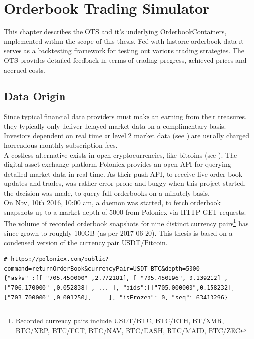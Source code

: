 \chapter{Orderbook Trading Simulator}
\label{chap:simulator}
This chapter describes the \ac{OTS} and it's underlying OrderbookContainers, implemented within the scope of this thesis. Fed with historic orderbook data it serves as a backtesting framework for testing out various trading strategies. The \ac{OTS} provides detailed feedback in terms of trading progress, achieved prices and accrued costs.

\section{Data Origin}
Since typical financial data providers must make an earning from their treasures, they typically only deliver delayed market data on a complimentary basis. Investors dependent on real time or level 2 market data (see ) are usually charged horrendous monthly subscription fees.\\

A costless alternative exists in open cryptocurrencies, like bitcoins (see ). The digital asset exchange platform Poloniex \cite{poloniex} provides an open API for querying detailed market data in real time. As their push API, to receive live order book updates and trades, was rather error-prone and buggy when this project started, the decision was made, to query full orderbooks on a minutely basis.\\

On Nov, 10th 2016, 10:00 am, a daemon was started, to fetch orderbook snapshots up to a market depth of 5000 from Poloniex via HTTP GET requests. The volume of recorded orderbook snapshots for nine distinct currency pairs\footnote{Recorded currency pairs include USDT/BTC, BTC/ETH, BT/XMR, BTC/XRP, BTC/FCT, BTC/NAV, BTC/DASH, BTC/MAID, BTC/ZEC} has since grown to roughly 100GB (as per 2017-06-20). This thesis is based on a condensed version of the currency pair USDT/Bitcoin.

\begin{lstlisting}[frame=single, breaklines=true, basicstyle=\scriptsize, caption=Data fetched from Poloniex via HTTP GET request, label=lst:PoloniexFetch]
# https://poloniex.com/public?command=returnOrderBook&currencyPair=USDT_BTC&depth=5000
{"asks" :[[ "705.450000" ,2.772181], [ "705.450196", 0.139212] ,["706.170000" ,0.052838] , ... ], "bids":[["705.000000",0.158232],["703.700000" ,0.001250], ... ], "isFrozen": 0, "seq": 63413296}
\end{lstlisting}

